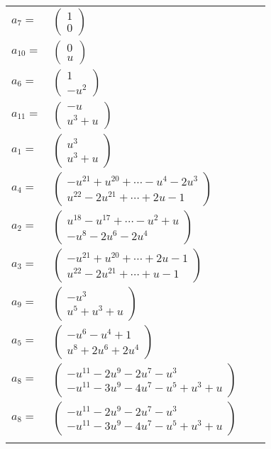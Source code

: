 \documentclass[1p]{elsarticle_modified}
\theoremstyle{definition}
\begin{document}
\begin{tabular}{m{7pt} m{180pt} m{7pt} m{180pt} }
\flushright $a_{7}=$&$\begin{pmatrix}1\\0\end{pmatrix}$ \\
\flushright $a_{10}=$&$\begin{pmatrix}0\\u\end{pmatrix}$ \\
\flushright $a_{6}=$&$\begin{pmatrix}1\\- u^2\end{pmatrix}$ \\
\flushright $a_{11}=$&$\begin{pmatrix}- u\\u^3+u\end{pmatrix}$ \\
\flushright $a_{1}=$&$\begin{pmatrix}u^3\\u^3+u\end{pmatrix}$ \\
\flushright $a_{4}=$&$\begin{pmatrix}- u^{21}+u^{20}+\cdots- u^4-2 u^3\\u^{22}-2 u^{21}+\cdots+2 u-1\end{pmatrix}$ \\
\flushright $a_{2}=$&$\begin{pmatrix}u^{18}- u^{17}+\cdots- u^2+u\\- u^8-2 u^6-2 u^4\end{pmatrix}$ \\
\flushright $a_{3}=$&$\begin{pmatrix}- u^{21}+u^{20}+\cdots+2 u-1\\u^{22}-2 u^{21}+\cdots+u-1\end{pmatrix}$ \\
\flushright $a_{9}=$&$\begin{pmatrix}- u^3\\u^5+u^3+u\end{pmatrix}$ \\
\flushright $a_{5}=$&$\begin{pmatrix}- u^6- u^4+1\\u^8+2 u^6+2 u^4\end{pmatrix}$ \\
\flushright $a_{8}=$&$\begin{pmatrix}- u^{11}-2 u^9-2 u^7- u^3\\- u^{11}-3 u^9-4 u^7- u^5+u^3+u\end{pmatrix}$\\ \flushright $a_{8}=$&$\begin{pmatrix}- u^{11}-2 u^9-2 u^7- u^3\\- u^{11}-3 u^9-4 u^7- u^5+u^3+u\end{pmatrix}$\\&\end{tabular}
\end{document}
